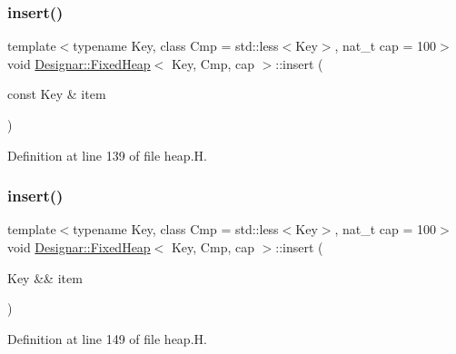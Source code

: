 \subsubsection{\texorpdfstring{insert()}{insert()}\hspace{0.1cm}{\footnotesize\ttfamily [1/2]}}
{\footnotesize\ttfamily template$<$typename Key, class Cmp = std\+::less$<$\+Key$>$, nat\+\_\+t cap = 100$>$ \\
void \hyperlink{class_designar_1_1_fixed_heap}{Designar\+::\+Fixed\+Heap}$<$ Key, Cmp, cap $>$\+::insert (\begin{DoxyParamCaption}\item[{const Key \&}]{item }\end{DoxyParamCaption})\hspace{0.3cm}{\ttfamily [inline]}}



Definition at line 139 of file heap.\+H.

\mbox{\label{class_designar_1_1_fixed_heap_a7169684fe8e25834174cd2b1edcaf567}} 
\subsubsection{\texorpdfstring{insert()}{insert()}\hspace{0.1cm}{\footnotesize\ttfamily [2/2]}}
{\footnotesize\ttfamily template$<$typename Key, class Cmp = std\+::less$<$\+Key$>$, nat\+\_\+t cap = 100$>$ \\
void \hyperlink{class_designar_1_1_fixed_heap}{Designar\+::\+Fixed\+Heap}$<$ Key, Cmp, cap $>$\+::insert (\begin{DoxyParamCaption}\item[{Key \&\&}]{item }\end{DoxyParamCaption})\hspace{0.3cm}{\ttfamily [inline]}}



Definition at line 149 of file heap.\+H.

\mbox{\label{class_designar_1_1_fixed_heap_a58cfde8fd6eedd215b79219970bf8fb8}} 

